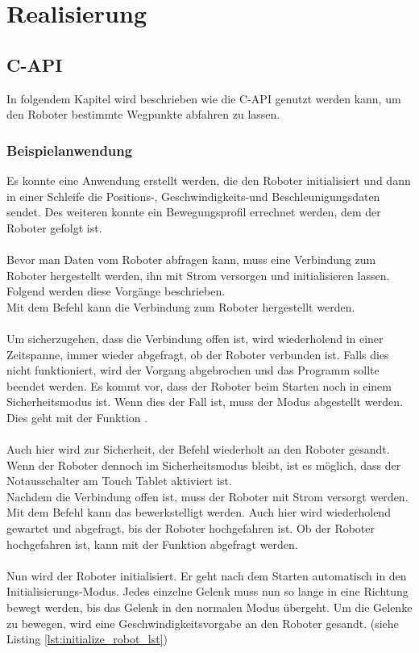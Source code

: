 \chapter{Realisierung}
\label{chap:umsetzung}

\section{C-API}
\label{sec:capi_rel}

In folgendem Kapitel wird beschrieben wie die C-API genutzt werden kann, um den Roboter bestimmte Wegpunkte abfahren zu lassen.

\subsection{Beispielanwendung}
\label{sub:capi-problems_rel}

Es konnte eine Anwendung erstellt werden, die den Roboter initialisiert und dann in einer Schleife die Positions-, Geschwindigkeits-und Beschleunigungsdaten sendet. Des weiteren konnte ein Bewegungsprofil errechnet werden, dem der Roboter gefolgt ist.
\\\\
Bevor man Daten vom Roboter abfragen kann, muss eine Verbindung zum Roboter hergestellt werden, ihn mit Strom versorgen und initialisieren lassen. Folgend werden diese Vorgänge beschrieben.\\
Mit dem Befehl  kann die Verbindung zum Roboter hergestellt werden.
\\\\
Um sicherzugehen, dass die Verbindung offen ist, wird wiederholend in einer Zeitspanne, immer wieder abgefragt, ob der Roboter verbunden ist. Falls dies nicht funktioniert, wird der Vorgang abgebrochen und das Programm sollte beendet werden. Es kommt vor, dass der Roboter beim Starten noch in einem Sicherheitsmodus ist. Wenn dies der Fall ist, muss der Modus abgestellt werden. Dies geht mit der Funktion .
\\\\
Auch hier wird zur Sicherheit, der Befehl wiederholt an den Roboter gesandt. Wenn der Roboter dennoch im Sicherheitsmodus bleibt, ist es möglich, dass der Notausschalter am Touch Tablet aktiviert ist.
\\
Nachdem die Verbindung offen ist, muss der Roboter mit Strom versorgt werden. Mit dem Befehl  kann das bewerkstelligt werden. Auch hier wird wiederholend gewartet und abgefragt, bis der Roboter hochgefahren ist. Ob der Roboter hochgefahren ist, kann mit der Funktion  abgefragt werden.
\\\\
Nun wird der Roboter initialisiert. Er geht nach dem Starten automatisch in den Initialisierungs-Modus. Jedes einzelne Gelenk muss nun so lange in eine Richtung bewegt werden, bis das Gelenk in den normalen Modus übergeht. Um die Gelenke zu bewegen, wird eine Geschwindigkeitsvorgabe an den Roboter gesandt. (siehe Listing \ref{lst:initialize_robot_lst})

